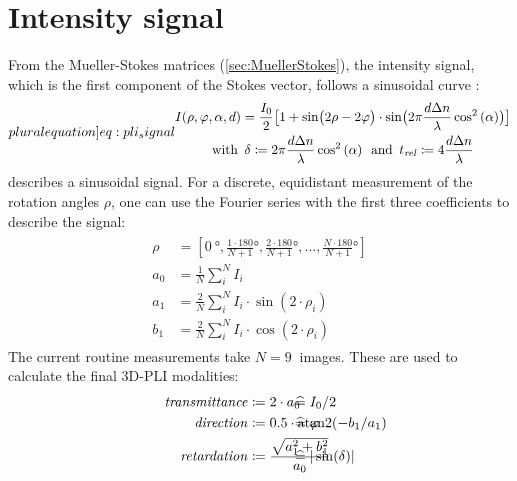 \section{Intensity signal}\label{sec::intSignal}
%
From the Mueller-Stokes matrices (\cref{sec:MuellerStokes}), the intensity signal, which is the first component of the Stokes vector, follows a sinusoidal curve \cite{MenzelMaster,MenzelDissertation}:
%
\begin{align}
\label[pluralequation]{eq:pli_signal}
\centering
\begin{gathered}
I(\rho, \varphi, \alpha, d) =\frac{I_0}{2}\bigl[ 1+ \sin\bigl(2\rho - 2\varphi \bigr)\cdot \sin \bigl( 2\pi\frac{d \dn}{\lambda} \cos^2\left( \alpha \right) \bigr) \bigr] \\
\text{with} \enspace \delta \coloneqq 2\pi\frac{d \dn}{\lambda} \cos^2\left( \alpha \right) \enspace
\text{and} \enspace \trel \coloneqq 4 \frac{d \dn}{\lambda}
\end{gathered}
\end{align}
%
 describes a sinusoidal signal.
For a discrete, equidistant measurement of the rotation angles $\rho$, one can use the Fourier series with the first three coefficients to describe the signal:
%
\begin{align}
\begin{split}
\rho &= [\SI{0}{\degree}, \frac{1\cdot180}{N+1}\si{\degree}, \frac{2\cdot180}{N+1}\si{\degree}, ..., \frac{N\cdot180}{N+1}\si{\degree}]\\
a_0 &= \frac{1}{N} \sum_i^N I_i\\
a_1 &= \frac{2}{N} \sum_i^N I_i \cdot \sin(2 \cdot \rho_i)\\
b_1 &= \frac{2}{N} \sum_i^N I_i \cdot \cos(2 \cdot \rho_i)
\end{split}
\end{align}
%
The current routine measurements take $N=\SI{9}{}$ images.
These are used to calculate the final \ac{3D-PLI} modalities:
%
\begin{align}
\begin{split}
\mathit{transmittance} &\coloneqq 2 \cdot a_0 \vphantom{I_0/2} \\
\mathit{direction} &\coloneqq 0.5 \cdot \atantwo(-b_1 / a_1) \vphantom{\varphi} \\
\mathit{retardation} &\coloneqq \frac{\sqrt{a_1^2 + b_1^2}}{a_0}  \vphantom{\sin(\delta)}
\end{split}
\hspace{-7em}
\begin{split}
& \mathrel{\widehat{=}} I_0/2 \vphantom{2 \cdot a_0}\\
& \mathrel{\widehat{=}} \varphi \vphantom{0.5 \cdot \atantwo(-b_1 / a_1)} \\
& \mathrel{\widehat{=}} |\sin(\delta)| \vphantom{\frac{\sqrt{a_1^2 + b_1^2}}{a_0}}
\end{split}
\end{align}
